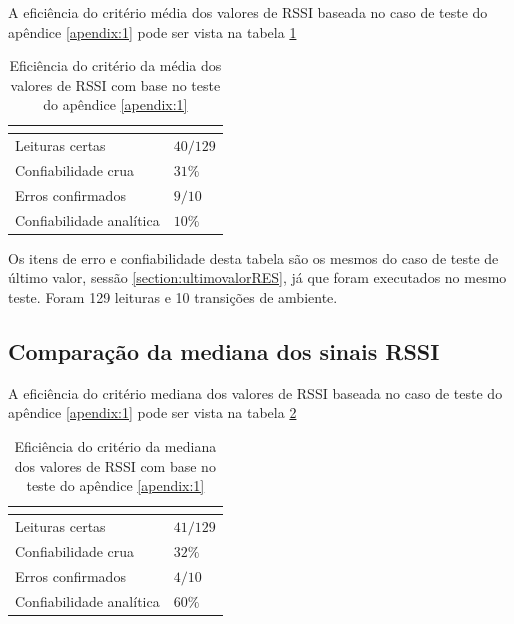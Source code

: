 A eficiência do critério média dos valores de RSSI baseada no caso de teste do apêndice \ref{apendix:1} pode ser vista na tabela \ref{tab:resultados3}

\begin{table}[H]
\centering
\caption{Eficiência do critério da média dos valores de RSSI com base no teste do apêndice \ref{apendix:1} }
\label{tab:resultados3}
\begin{tabular}{p{5cm} p{5cm}}
\hline
\multicolumn{2}{c}{\cellcolor{lightgray}{Eficiência do critério: Média dos valores de RSSI}} \\ \hline
Leituras certas         &   $40 / 129$        \\
Confiabilidade crua    &   $31\%$     \\
Erros confirmados          &  $9 / 10$        \\
Confiabilidade analítica & $10\%$ \\ \hline
\end{tabular}
\end{table}

Os itens de erro e confiabilidade desta tabela são os mesmos do caso de teste de último valor, sessão \ref{section:ultimovalorRES}, já que foram executados no mesmo teste. Foram 129 leituras e 10 transições de ambiente.

\subsection{Comparação da mediana dos sinais RSSI}

A eficiência do critério mediana dos valores de RSSI baseada no caso de teste do apêndice \ref{apendix:1} pode ser vista na tabela \ref{tab:resultados4}

\begin{table}[H]
\centering
\caption{Eficiência do critério da mediana dos valores de RSSI com base no teste do apêndice \ref{apendix:1} }
\label{tab:resultados4}
\begin{tabular}{p{5cm} p{5cm}}
\hline
\multicolumn{2}{c}{\cellcolor{lightgray}{Eficiência do critério: Mediana dos valores de RSSI}} \\ \hline
Leituras certas         &   $41 / 129$        \\
Confiabilidade crua    &   $32\%$     \\
Erros confirmados          &  $4 / 10$        \\
Confiabilidade analítica & $60\%$ \\ \hline
\end{tabular}
\end{table}

